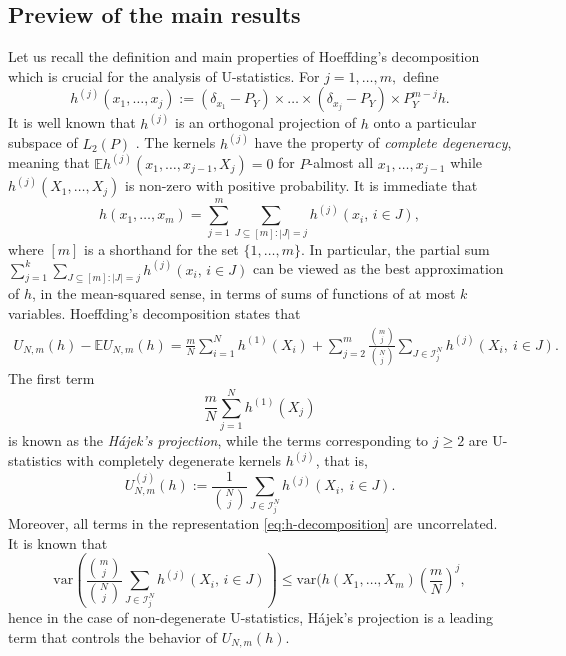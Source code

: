 \documentclass[12pt]{article}
\newcommand\var{\mathrm{var}}
\newcommand{\ben}[1]{\begin{equation}#1\end{equation}}
\def\l{\left}
\def\r{\right}
\newcommand{\mb}{\mathbb}
\theoremstyle{thmstyletwo}%
\theoremstyle{thmstylethree}%
\begin{document}
\subsection{Preview of the main results}
\label{section:prelim}

Let us recall the definition and main properties of Hoeffding's decomposition which is crucial for the analysis of U-statistics. For $j=1,\ldots,m,$ define 
\ben{
\label{eq:pi}
h^{(j)}(x_1,\ldots,x_j):=(\delta_{x_1} - P_Y)\times\ldots\times(\delta_{x_j}-P_Y)\times P_Y^{m-j} h.
}
It is well known that $h^{(j)}$ is an orthogonal projection of $h$ onto a particular subspace of $L_2(P)$ \citep[][section 1.7]{lee2019u}.
The kernels $h^{(j)}$ have the property of \emph{complete degeneracy}, meaning that $\mb E h^{(j)}(x_1,\ldots,x_{j-1},X_j) = 0$ for $P$-almost all $x_1,\ldots,x_{j-1}$ while $h^{(j)}(X_1,\ldots,X_j)$ is non-zero with positive probability. It is immediate that 
\[
h(x_1,\ldots,x_m) = \sum_{j=1}^m \sum_{J\subseteq [m]: |J|=j} h^{(j)}(x_i,\, i\in J),
\]
where $[m]$ is a shorthand for the set $\{1,\ldots,m\}$. 
In particular, the partial sum $\sum_{j=1}^k \sum_{J\subseteq [m]: |J|=j} h^{(j)}(x_i,\, i\in J)$ can be viewed as the best approximation of $h$, in the mean-squared sense, in terms of sums of functions of at most $k$ variables. 
Hoeffding's decomposition \citep{hoeffding1948class} states that 
\begin{align}
\label{eq:h-decomposition}
  U_{N,m}(h) - \mb E U_{N,m}(h) = \frac{m}{N} \sum_{i=1}^N h^{(1)}\l(X_i\r) + \sum_{j=2}^m \frac{{m \choose j}}{{N \choose j}} \sum_{J \in \mathcal{I}^N_j} h^{(j)}\l(X_i,\  i \in J\r).
\end{align}
The first term 
\[
\frac{m}{N} \sum_{j=1}^N h^{(1)}\l(X_j\r)
\]
is known as the \textit{H\'{a}jek's projection}, while the terms corresponding to $j\geq 2$ are U-statistics with completely degenerate kernels $h^{(j)}$, that is, 
\[
U_{N,m}^{(j)}(h):=\frac{1}{{N\choose j}} \sum\limits_{J \in \mathcal{I}^N_j} h^{(j)}(X_i, \ i\in J).
\]
Moreover, all terms in the representation \eqref{eq:h-decomposition} are uncorrelated. It is known \citep{minsker2023u} that 
\[
\var\l(  \frac{{m\choose j} }{{N\choose j}} \sum_{J \in \mathcal{I}^N_j} h^{(j)}(X_i,\, i\in J) \r)\leq \var(h(X_1,\ldots,X_m) \l( \frac{m}{N}\r)^j,
\]
hence in the case of non-degenerate U-statistics, H\'{a}jek's projection is a leading term that controls the behavior of $U_{N,m}(h)$. 
\end{document}
